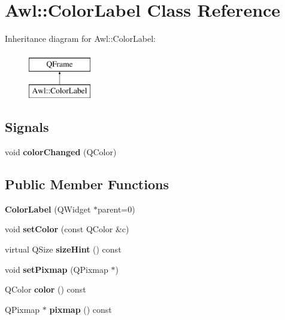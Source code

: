 \hypertarget{class_awl_1_1_color_label}{}\section{Awl\+:\+:Color\+Label Class Reference}
\label{class_awl_1_1_color_label}
Inheritance diagram for Awl\+:\+:Color\+Label\+:\begin{figure}[H]
\begin{center}
\leavevmode
\includegraphics[height=2.000000cm]{class_awl_1_1_color_label}
\end{center}
\end{figure}
\subsection*{Signals}
\begin{DoxyCompactItemize}
\item 
\mbox{\label{class_awl_1_1_color_label_a0e42a3f8a8ada3ff9c71a9e7f5d063d1}} 
void {\bfseries color\+Changed} (Q\+Color)
\end{DoxyCompactItemize}
\subsection*{Public Member Functions}
\begin{DoxyCompactItemize}
\item 
\mbox{\label{class_awl_1_1_color_label_a09cafc26e6e0ea66b9a852840b912bc2}} 
{\bfseries Color\+Label} (Q\+Widget $\ast$parent=0)
\item 
\mbox{\label{class_awl_1_1_color_label_a92c2d80a8c943920a5eb61f514024776}} 
void {\bfseries set\+Color} (const Q\+Color \&c)
\item 
\mbox{\label{class_awl_1_1_color_label_a8d6f6450aab376238fddeb9eb1a034e7}} 
virtual Q\+Size {\bfseries size\+Hint} () const
\item 
\mbox{\label{class_awl_1_1_color_label_aad3cb2a31eead8ab582bc3bd06002fbc}} 
void {\bfseries set\+Pixmap} (Q\+Pixmap $\ast$)
\item 
\mbox{\label{class_awl_1_1_color_label_aaca63b43f1e07701cc42eec1d79d5066}} 
Q\+Color {\bfseries color} () const
\item 
\mbox{\label{class_awl_1_1_color_label_a6bc5f2d44c1c0409fd4fbb2531e8c36b}} 
Q\+Pixmap $\ast$ {\bfseries pixmap} () const
\end{DoxyCompactItemize}
